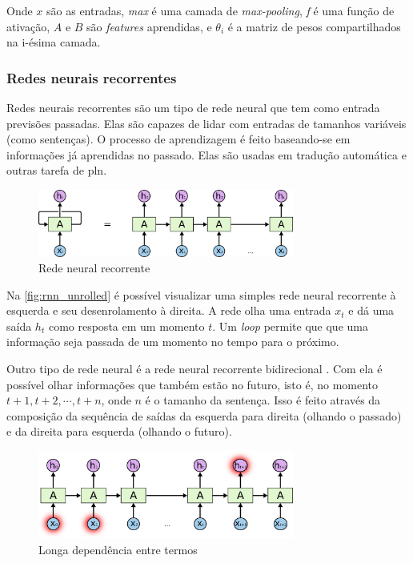 Onde $x$ são as entradas, \textit{max} é uma camada de \textit{max-pooling}, \textit{f} é uma função de ativação, $A$ e $B$ são \textit{features} aprendidas, e $\theta_i$ é a matriz de pesos compartilhados na i-ésima camada. 



\subsubsection{Redes neurais recorrentes}

Redes neurais recorrentes são um tipo de rede neural que tem como entrada previsões passadas. Elas são capazes de lidar com entradas de tamanhos variáveis (como sentenças). O processo de aprendizagem é feito baseando-se em informações já aprendidas no passado. Elas são usadas em tradução automática \cite{kombrink2011recurrent} e outras tarefa de \ac{pln}.

  
\begin{figure}[!htb]
\centering
\caption{Rede neural recorrente} \label{fig:rnn_unrolled}
\includegraphics[width=0.75\textwidth]{img/rnn_unrolled.png}
\end{figure}

Na \autoref{fig:rnn_unrolled} é possível visualizar uma simples rede neural recorrente à esquerda e seu desenrolamento à direita. A rede olha uma entrada $x_t$ e dá uma saída $h_t$ como resposta em um momento $t$. Um \textit{loop} permite que que uma informação seja passada de um momento no tempo para o próximo. 

Outro tipo de rede neural é a rede neural recorrente bidirecional \cite{schuster1997bidirectional}. Com ela é possível olhar informações que também estão no futuro, isto é, no momento $t+1, t+2, \cdots, t+n$, onde $n$ é o tamanho da sentença. Isso é feito através da composição da sequência de saídas da esquerda para direita (olhando o passado) e da direita para esquerda (olhando o futuro). 


\begin{figure}[!htb]
\centering
\caption{Longa dependência entre termos} \label{fig:rnn_longtermdependencies}
\includegraphics[width=0.75\textwidth]{img/rnn_longtermdependencies.png}
\end{figure}

